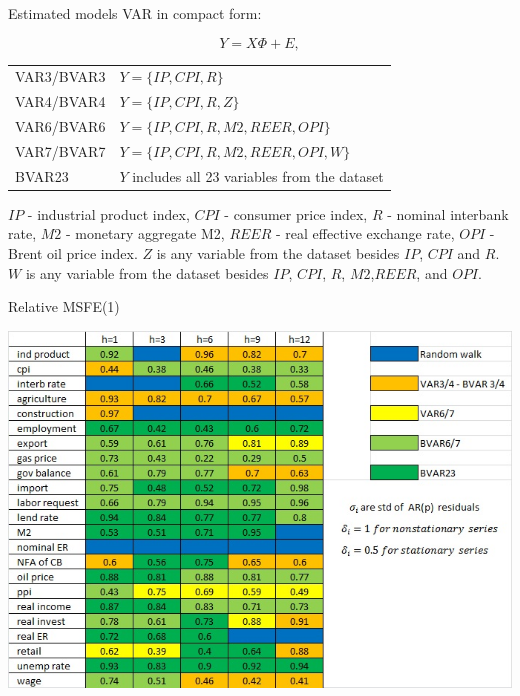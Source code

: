 \documentclass{beamer} %
\begin{document}
\begin{frame}{Estimated models} %
VAR in compact  form:

\begin{equation}
Y=X\Phi+E,\label{var}
\end{equation}
\begin{center}
\begin{tabular}{p{2.5cm}l}
\toprule
VAR3/BVAR3&$Y=\lbrace IP, CPI, R \rbrace$\\
VAR4/BVAR4 &$Y=\lbrace IP, CPI, R, Z\rbrace$ \\
VAR6/BVAR6& $Y=\lbrace IP, CPI, R, M2, REER, OPI \rbrace$ \\
VAR7/BVAR7&$Y=\lbrace IP, CPI, R, M2, REER, OPI, W \rbrace$\\
BVAR23&$Y$ includes all 23 variables from the dataset\\
\bottomrule
\end{tabular}
\end{center}
$IP$ - industrial product index, $CPI$ - consumer price index, $R$ - nominal interbank rate, $M2$ - monetary aggregate M2, $REER$ - real effective exchange rate, $OPI$ - Brent oil price index. $Z$ is any variable from the dataset besides $IP$, $CPI$ and $R$.  $W$ is any variable from the dataset besides $IP$, $CPI$, $R$, $M2$,$REER$, and $OPI$.
\end{frame}

\begin{frame}{Relative MSFE(1)} %
\vspace{-5mm}
\begin{center}
\includegraphics[scale=0.60]{hyper3.jpg}
\end{center}
\end{frame}
\end{document}
